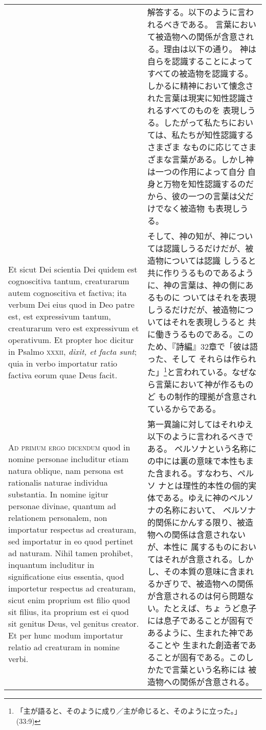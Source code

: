 \documentclass[10pt]{jsarticle} %
\begin{document}
\begin{longtable}{p{21em}p{21em}}
&

解答する。以下のように言われるべきである。
言葉において被造物への関係が含意される。理由は以下の通り。
神は自らを認識することによってすべての被造物を認識する。
しかるに精神において懐念された言葉は現実に知性認識されるすべてのものを
 表現しうる。したがって私たちにおいては、私たちが知性認識するさまざま
 なものに応じてさまざまな言葉がある。しかし神は一つの作用によって自分
 自身と万物を知性認識するのだから、彼の一つの言葉は父だけでなく被造物
 も表現しうる。
\\

Et sicut Dei scientia Dei quidem est
cognoscitiva tantum, creaturarum autem cognoscitiva et factiva; ita
verbum Dei eius quod in Deo patre est, est expressivum tantum,
creaturarum vero est expressivum et operativum. Et propter hoc dicitur
in Psalmo {\scshape xxxii}, {\itshape dixit, et facta sunt}; quia in verbo importatur ratio
factiva eorum quae Deus facit.

&

そして、神の知が、神については認識しうるだけだが、被造物については認識
 しうると共に作りうるものであるように、神の言葉は、神の側にあるものに
 ついてはそれを表現しうるだけだが、被造物についてはそれを表現しうると
 共に働きうるものである。このため、『詩編』32章で「彼は語った、そして
 それらは作られた」\footnote{「主が語ると、そのように成り／主が命じると、そのように立った。」(33:9)}と言われている。なぜなら言葉において神が作るものど
 もの制作的理拠が含意されているからである。

\\



{\scshape Ad primum ergo dicendum} quod in nomine personae includitur etiam
natura oblique, nam persona est rationalis naturae individua
substantia. In nomine igitur personae divinae, quantum ad relationem
personalem, non importatur respectus ad creaturam, sed importatur in
eo quod pertinet ad naturam. Nihil tamen prohibet, inquantum
includitur in significatione eius essentia, quod importetur respectus
ad creaturam, sicut enim proprium est filio quod sit filius, ita
proprium est ei quod sit genitus Deus, vel genitus creator. Et per
hunc modum importatur relatio ad creaturam in nomine verbi.

&

第一異論に対してはそれゆえ以下のように言われるべきである。
ペルソナという名称にの中には裏の意味で本性もまた含まれる。すなわち、ペルソ
 ナとは理性的本性の個的実体である。ゆえに神のペルソナの名称において、
 ペルソナ的関係にかんする限り、被造物への関係は含意されないが、本性に
 属するものにおいてはそれが含意される。しかし、その本質の意味に含まれ
 るかぎりで、被造物への関係が含意されるのは何ら問題ない。たとえば、ちょ
 うど息子には息子であることが固有であるように、生まれた神であることや
 生まれた創造者であることが固有である。このしかたで言葉という名称には
 被造物への関係が含意される。


\end{longtable}
\end{document}
